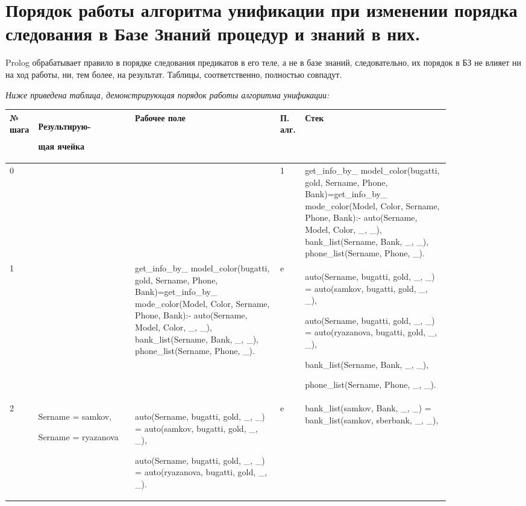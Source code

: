 \documentclass[a4paper,12pt]{article}
\begin{document}
	\newpage
	
	\section*{Порядок работы алгоритма унификации при изменении порядка следования в Базе Знаний процедур и знаний в них.}
	
	Prolog обрабатывает правило в порядке следования предикатов в его теле, а не в базе знаний, следовательно, их порядок в БЗ не влияет ни на ход работы, ни, тем более, на результат. Таблицы, соответственно, полностью совпадут.
	
	\textit{Ниже приведена таблица, демонстрирующая порядок работы алгоритма унификации:}
	
	\begin{center}
		\begin{longtable}[h!]{|p{0.025\linewidth}|p{0.2\linewidth}|p{ 0.3\linewidth}|p{ 0.025\linewidth}|p{ 0.3\linewidth}|}
			\hline
			{\bf  № шага} & {\bf Результирую-
				
				щая ячейка} & {\bf Рабочее поле} & {\bf П. алг.} & {\bf Стек}\\
			\hline
			{0} & {} & {} & {1} & {get\_info\_by\_
				model\_color(bugatti, gold, Sername, Phone, Bank)=get\_info\_by\_
				mode\_color(Model, Color, Sername, Phone, Bank):- auto(Sername, Model, Color, \_, \_), bank\_list(Sername, Bank, \_, \_), phone\_list(Sername, Phone, \_).}\\
			\hline
			{1} & {} & {get\_info\_by\_
				model\_color(bugatti, gold, Sername, Phone, Bank)=get\_info\_by\_
				mode\_color(Model, Color, Sername, Phone, Bank):- auto(Sername, Model, Color, \_, \_), bank\_list(Sername, Bank, \_, \_), phone\_list(Sername, Phone, \_).} & {e} & {auto(Sername, bugatti, gold, \_, \_) = auto(samkov, bugatti, gold, \_, \_),
			
				auto(Sername, bugatti, gold, \_, \_) = auto(ryazanova, bugatti, gold, \_, \_),
			
				bank\_list(Sername, Bank, \_, \_),
			
				phone\_list(Sername, Phone, \_, \_).}\\
			\hline
			{2} & {Sername = samkov,
			
		Sername = ryazanova} & {auto(Sername, bugatti, gold, \_, \_) = auto(samkov, bugatti, gold, \_, \_),
			
				auto(Sername, bugatti, gold, \_, \_) = auto(ryazanova, bugatti, gold, \_, \_).} & {e} & {bank\_list(samkov, Bank, \_, \_) = bank\_list(samkov, sberbank, \_, \_),
			
}
\end{longtable}
\end{center}
\end{document}
